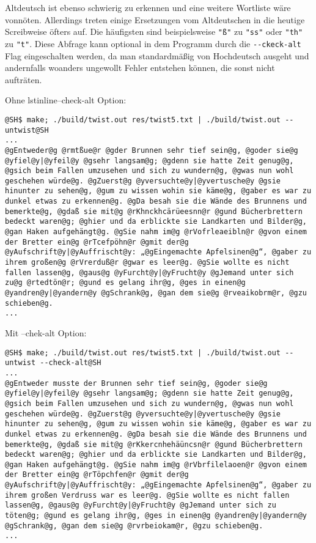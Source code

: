 \documentclass[a4paper,10pt,ngerman]{scrartcl}
\begin{document}
Altdeutsch ist ebenso schwierig zu erkennen und eine weitere Wortliste wäre vonnöten. Allerdings treten einige Ersetzungen vom Altdeutschen in die heutige Screibweise öfters auf. Die häufigsten sind beispielsweise \lstinline{"ß"} zu \lstinline{"ss"} oder \lstinline{"th"} zu \lstinline{"t"}. Diese Abfrage kann optional in dem Programm durch die \lstinline{--ckeck-alt} Flag eingeschalten werden, da man standardmäßig von Hochdeutsch ausgeht und andernfalls woanders ungewollt Fehler entstehen können, die sonst nicht aufträten.

Ohne lstinline{--check-alt} Option:
\begin{lstlisting}
@SH$ make; ./build/twist.out res/twist5.txt | ./build/twist.out --untwist@SH
...
@gEntweder@g @rmtßue@r @gder Brunnen sehr tief sein@g, @goder sie@g @yfiel@y|@yfeil@y @gsehr langsam@g; @gdenn sie hatte Zeit genug@g, @gsich beim Fallen umzusehen und sich zu wundern@g, @gwas nun wohl geschehen würde@g. @gZuerst@g @yversuchte@y|@yvertusche@y @gsie hinunter zu sehen@g, @gum zu wissen wohin sie käme@g, @gaber es war zu dunkel etwas zu erkennen@g. @gDa besah sie die Wände des Brunnens und bemerkte@g, @gdaß sie mit@g @rKhnckhcärüeesnn@r @gund Bücherbrettern bedeckt waren@g; @ghier und da erblickte sie Landkarten und Bilder@g, @gan Haken aufgehängt@g. @gSie nahm im@g @rVofrleaeibln@r @gvon einem der Bretter ein@g @rTcefpöhn@r @gmit der@g @yAufschrift@y|@yAuffrischt@y: „@gEingemachte Apfelsinen@g“, @gaber zu ihrem großen@g @rVrerduß@r @gwar es leer@g. @gSie wollte es nicht fallen lassen@g, @gaus@g @yFurcht@y|@yFrucht@y @gJemand unter sich zu@g @rtedtön@r; @gund es gelang ihr@g, @ges in einen@g @yandren@y|@yandern@y @gSchrank@g, @gan dem sie@g @rveaikobrm@r, @gzu schieben@g.
...
\end{lstlisting}

Mit --chek-alt Option:
\begin{lstlisting}
@SH$ make; ./build/twist.out res/twist5.txt | ./build/twist.out --untwist --check-alt@SH
...
@gEntweder musste der Brunnen sehr tief sein@g, @goder sie@g @yfiel@y|@yfeil@y @gsehr langsam@g; @gdenn sie hatte Zeit genug@g, @gsich beim Fallen umzusehen und sich zu wundern@g, @gwas nun wohl geschehen würde@g. @gZuerst@g @yversuchte@y|@yvertusche@y @gsie hinunter zu sehen@g, @gum zu wissen wohin sie käme@g, @gaber es war zu dunkel etwas zu erkennen@g. @gDa besah sie die Wände des Brunnens und bemerkte@g, @gdaß sie mit@g @rKkercnhehäüncsn@r @gund Bücherbrettern bedeckt waren@g; @ghier und da erblickte sie Landkarten und Bilder@g, @gan Haken aufgehängt@g. @gSie nahm im@g @rVbrfilelaoen@r @gvon einem der Bretter ein@g @rTöpchfen@r @gmit der@g @yAufschrift@y|@yAuffrischt@y: „@gEingemachte Apfelsinen@g“, @gaber zu ihrem großen Verdruss war es leer@g. @gSie wollte es nicht fallen lassen@g, @gaus@g @yFurcht@y|@yFrucht@y @gJemand unter sich zu töten@g; @gund es gelang ihr@g, @ges in einen@g @yandren@y|@yandern@y @gSchrank@g, @gan dem sie@g @rvrbeiokam@r, @gzu schieben@g.
...
\end{lstlisting}
\end{document}
